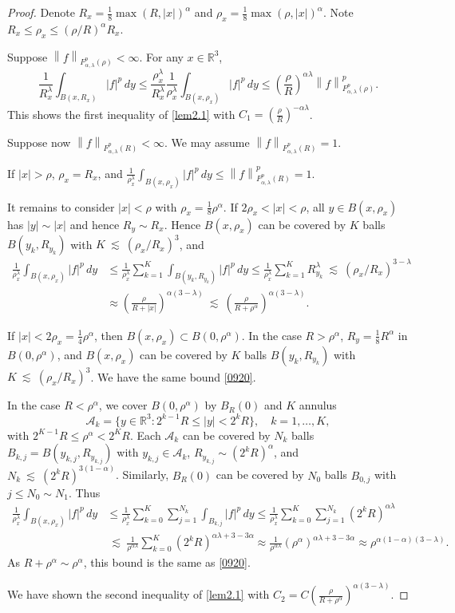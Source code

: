 \documentclass[11pt]{article}
\numberwithin{equation}{section}
\theoremstyle{remark}
\theoremstyle{definition}
\newcommand{\bke}[1]{\left ( #1 \right )}
\newcommand{\norm}[1]{\left \| #1 \right \|}
\newcommand{\R}{\mathbb{R}}
\newcommand{\lec}{{\ \lesssim \ }}
\newcommand\al{\alpha}
\newcommand\la{\lambda}
\newcommand{\EQS}[1]{\begin{equation}\begin{split} #1 \end{split}\end{equation}}
\newcommand{\EQN}[1]{\begin{equation*}\begin{split} #1 \end{split}\end{equation*}}
\begin{document}
\begin{proof} Denote $R_x=\frac18\max(R,|x|)^\al$ and $\rho_x=\frac18\max(\rho,|x|)^\al$. Note $R_x\le \rho_x \le (\rho/R)^\al R_x$.

Suppose $\norm{f}_{F^{p}_{\al,\lambda}(\rho)}<\infty$. For any $x\in\R^3$,
\[
\frac{1}{R_x^{\la}}\int_{B(x,R_x)}|f|^p\,dy\le \frac{\rho_x^{\la}}{R_x^{\la}}\frac{1}{\rho_x^{\la}}\int_{B(x,\rho_x)}|f|^p\,dy \le \bke{\frac \rho R}^{\al \la} \norm{f}_{F^{p}_{\al,\lambda}(\rho)}^p.
\]
This shows the first inequality of \eqref{lem2.1} with $C_1 = \bke{\frac \rho R}^{-{\al \la}}$.


%
%
%
%
%
%
%
%
%
%
%
%
%


Suppose now $\norm{f}_{F^{p}_{\al,\lambda}(R)}<\infty$. We may assume $\norm{f}_{F^{p}_{\al,\lambda}(R)}=1$.


If $|x|>\rho$, $\rho_x=R_x$, and
$
\frac{1}{\rho_x^{\la}}\int_{B(x,\rho_x)}|f|^p\,dy \le \norm{f}_{F^{p}_{\al,\lambda}(R)}^p=1$.


It remains to consider $|x|<\rho$ with $\rho_x= \frac 18 \rho^\al$.
If $2\rho_x < |x| < \rho$, all $y \in B(x,\rho_x)$ has $|y| \sim |x|$ and hence $R_y \sim R_x$. Hence $B(x,\rho_x)$ can be covered by $K$ balls $B(y_k,R_{y_k})$ with $K \lec (\rho_x/R_x)^3$, and
\EQS{\label{0920}
\frac{1}{\rho_x^{\la}}\int_{B(x,\rho_x)}|f|^p\,dy
&\le \frac{1}{\rho_x^{\la}}\sum_{k=1}^K \int_{B(y_k, R_{y_k})}|f|^p\,dy
\le \frac{1}{\rho_x^{\la}}\sum_{k=1}^K R_{y_k}^\la
\lec (\rho_x/R_x)^{3-\la}
\\
&\approx \bke{\frac \rho{R+|x|}}^{\al(3-\la)}
\lec \bke{\frac \rho{R+\rho^\al}}^{\al(3-\la)}.
}

If $|x|<2\rho_x =  \frac 14 \rho^\al$, then $B(x,\rho_x)\subset B(0,\rho^\al)$. In the case $R>\rho^\al$,
$R_y = \frac 18 R^\al$ in $B(0,\rho^\al)$, and $B(x,\rho_x)$ can be covered by $K$ balls $B(y_k,R_{y_k})$ with $K \lec (\rho_x/R_x)^3$. We have the same bound \eqref{0920}.

In the case $R<\rho^\al$, we cover $B(0,\rho^\al)$ by $B_R(0)$ and $K$ annulus
\[
\mathcal A_k = \{ y \in \R^3: 2^{k-1} R \le |y|< 2^{k}R\}, \quad k=1,\ldots,K,
\]
with $2^{K-1} R \le \rho^\al< 2^{K}R$. Each $\mathcal A_k$ can be covered by $N_k$ balls $B_{k,j}=B(y_{k,j}, R_{y_{k,j}})$ with $y_{k,j} \in \mathcal A_k$, $R_{y_{k,j}} \sim ( 2^k R)^\al $, and $N_k \lec ( 2^k R)^{3(1-\al)} $. Similarly, $B_R(0)$ can be covered by $N_0$ balls $B_{0,j}$ with $j \le N_0 \sim N_1$.
Thus
\EQN{
\frac{1}{\rho_x^{\la}}\int_{B(x,\rho_x)}|f|^p\,dy
&\le \frac{1}{\rho_x^{\la}}\sum_{k=0}^K \sum_{j=1}^{N_k} \int_{B_{k,j}} |f|^p\,dy
\le \frac{1}{\rho_x^{\la}}\sum_{k=0}^K \sum_{j=1}^{N_k}  ( 2^k R)^{\al \la}
\\
&\lec \frac{1}{\rho^{\al \la}}\sum_{k=0}^K (2^k R )^{\al \la+3 -3\al}
\approx \frac{1}{\rho^{\al \la}}(\rho^{\al} )^{\al \la+3 -3\al}\approx \rho ^{\al(1-\al)(3-\la)}.
}
As $R+\rho^\al \sim \rho^\al$, this bound is the same as \eqref{0920}.

We have shown the second inequality of \eqref{lem2.1} with
$C_2 = C \bke{\frac \rho{R+\rho^\al}}^{\al(3-\la)}$.
\end{proof}
\end{document}
